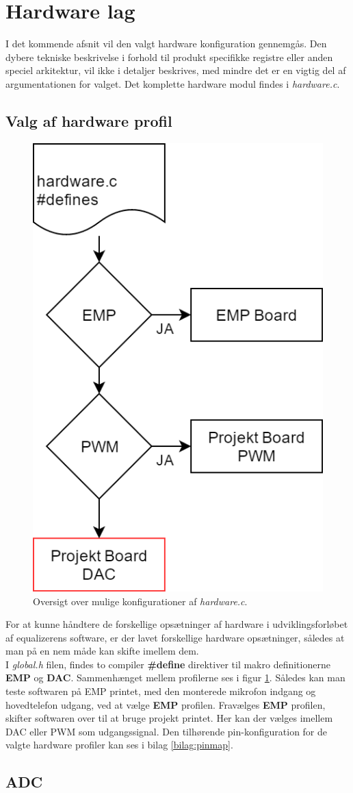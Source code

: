 \section{Hardware lag}
I det kommende afsnit vil den valgt hardware konfiguration gennemgås. 
Den dybere tekniske beskrivelse i forhold til produkt specifikke registre eller anden speciel arkitektur, vil ikke i detaljer beskrives, med mindre det er en vigtig del af argumentationen for valget.
Det komplette hardware modul findes i \emph{hardware.c}.

\subsection{Valg af hardware profil}
\begin{figure}
	\centering
	\includegraphics[width=.3\textwidth]{billeder/hardware_profiles.png}
	\caption{Oversigt over mulige konfigurationer af \textit{hardware.c}.}
	\label{fig:hardware_profiler}
\end{figure}
For at kunne håndtere de forskellige opsætninger af hardware i udviklingsforløbet af equalizerens software, er der lavet forskellige hardware opsætninger, således at man på en nem måde kan skifte imellem dem.
\\
I \textit{global.h} filen, findes to compiler \textbf{\#define} direktiver til makro definitionerne \textbf{EMP} og \textbf{DAC}.
Sammenhænget mellem profilerne ses i figur \ref{fig:hardware_profiler}. 
Således kan man teste softwaren på EMP printet, med den monterede mikrofon indgang og hovedtelefon udgang, ved at vælge \textbf{EMP} profilen.
Fravælges \textbf{EMP} profilen, skifter softwaren over til at bruge projekt printet.
Her kan der vælges imellem DAC eller PWM som udgangssignal.  
Den tilhørende pin-konfiguration for de valgte hardware profiler kan ses i bilag \ref{bilag:pinmap}.

\subsection{ADC}

